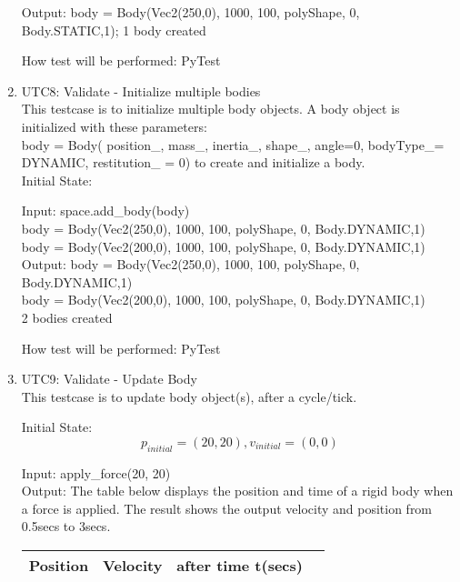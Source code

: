 \documentclass[12pt, titlepage]{article}
\begin{document}
\begin{enumerate}
Output: body = Body(Vec2(250,0), 1000, 100, polyShape, 0, Body.STATIC,1); 1 body created

How test will be performed: PyTest\\

\item{UTC8}{: Validate - Initialize multiple bodies\\}
This testcase is to initialize multiple body objects.
A body object is initialized with these parameters:\\ 
body = Body( position\_, mass\_, inertia\_, shape\_, angle=0, bodyType\_= DYNAMIC, restitution\_ = 0) to create and initialize a body.\\

Initial State: 

Input: space.add\_body(body)\\
body = Body(Vec2(250,0), 1000, 100, polyShape, 0, Body.DYNAMIC,1)\\
body = Body(Vec2(200,0), 1000, 100, polyShape, 0, Body.DYNAMIC,1)\\

Output: body = Body(Vec2(250,0), 1000, 100, polyShape, 0, Body.DYNAMIC,1)\\
        body = Body(Vec2(200,0), 1000, 100, polyShape, 0, Body.DYNAMIC,1)\\
        2 bodies created

How test will be performed: PyTest\\

\item{UTC9}{: Validate - Update Body\\}
This testcase is to update body object(s), after a cycle/tick.

Initial State: \[p_{initial} = (20,20), v_{initial} = (0, 0)\]
            
Input: apply\_force(20, 20)\\
Output: The table below displays the position and time of a rigid body when a force is applied. The result shows the output velocity and position from 0.5secs to 3secs.
\begin{table} [h!]
	
	\centering
	
	\begin{tabular}{|c|c|c|c}
		
		\hline	
		
	\textbf{Position} &\textbf{Velocity} & \textbf{after time t(secs)}\\
	\hline 


\end{tabular}
\end{table}
\end{enumerate}
\end{document}
